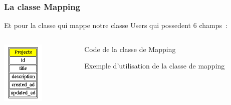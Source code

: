 \documentclass{beamer}
\begin{document}
\begin{frame}
    \frametitle{La classe Mapping}
    Et pour la classe qui mappe notre classe Users qui possedent 6 champs~:
   
    \begin{columns}
        \begin{column}[l]{3cm}
            \includegraphics[width=20mm]{project.png}
        \end{column}
        
        \begin{column}[r]{10cm}
            \begin{block}{Code de la classe de Mapping}
                      
            \end{block}
            \begin{block}{Exemple d'utilisation de la classe de mapping}
                      
            \end{block}
        \end{column}
    \end{columns}

\end{frame}
\end{document}
